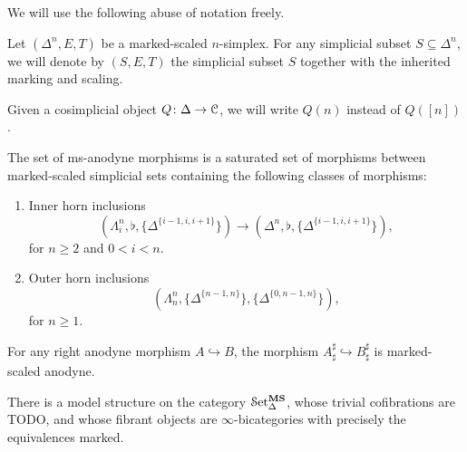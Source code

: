 \documentclass[main.tex]{subfiles}
\begin{document}
We will use the following abuse of notation freely.

\begin{notation}
  Let $(\Delta^{n}, E, T)$ be a marked-scaled $n$-simplex. For any simplicial subset $S \subseteq \Delta^{n}$, we will denote by $(S, E, T)$ the simplicial subset $S$ together with the inherited marking and scaling.
\end{notation}

\begin{notation}
  Given a cosimplicial object $Q\colon \Delta \to \mathcal{C}$, we will write $Q(n)$ instead of $Q([n])$.
\end{notation}

\begin{definition}
  \label{def:ms-anodyne_morphisms}
  The set of ms-anodyne morphisms is a saturated set of morphisms between marked-scaled simplicial sets containing the following classes of morphisms:
  \begin{enumerate}[label=(A\arabic*)]
    \item\label{item:innerms} Inner horn inclusions
      \begin{equation*}
        (\Lambda^{n}_{i}, \flat, \{\Delta^{\{i-1,i,i+1\}}\}) \to (\Delta^{n}, \flat, \{\Delta^{\{i-1,i,i+1\}}\}),
      \end{equation*}
      for $n \geq 2$ and $0 < i < n$.

    \item\label{item:outerms} Outer horn inclusions
      \begin{equation*}
        (\Lambda^{n}_{n}, \{\Delta^{\{n-1,n\}}\}, \{\Delta^{\{0, n-1, n\}}\}),
      \end{equation*}
      for $n \geq 1$.
  \end{enumerate}
\end{definition}

\begin{proposition}
  \label{prop:sharp_marked_right_anodyne}
  For any right anodyne morphism $A \hookrightarrow B$, the morphism $A^{\sharp}_{\sharp} \hookrightarrow B^{\sharp}_{\sharp}$ is marked-scaled anodyne.
\end{proposition}

\begin{theorem}
  There is a model structure on the category $\mathcal{S}\mathrm{et}_{\Delta}^{\mathbf{MS}}$, whose trivial cofibrations are TODO, and whose fibrant objects are $\infty$-bicategories with precisely the equivalences marked.
\end{theorem}
\end{document}
